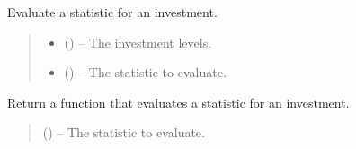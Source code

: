 \documentclass[letterpaper,10pt,english]{sphinxmanual}
\begin{document}
\begin{fulllineitems}

\begin{fulllineitems}
\label{\detokenize{tyche:tyche.Evaluator.Evaluator.evaluate_statistic}}
\pysigstartsignatures
{}
\pysigstopsignatures
\sphinxAtStartPar
Evaluate a statistic for an investment.
\begin{quote}\begin{description}
\begin{itemize}
\item {} 
\sphinxAtStartPar
{} () – The investment levels.

\item {} 
\sphinxAtStartPar
{} () – The statistic to evaluate.

\end{itemize}

\end{description}\end{quote}

\end{fulllineitems}


\begin{fulllineitems}
\label{\detokenize{tyche:tyche.Evaluator.Evaluator.make_statistic_evaluator}}
\pysigstartsignatures
{}
\pysigstopsignatures
\sphinxAtStartPar
Return a function that evaluates a statistic for an investment.
\begin{quote}\begin{description}
\sphinxAtStartPar
{} () – The statistic to evaluate.

\end{description}\end{quote}

\end{fulllineitems}


\end{fulllineitems}
\end{document}
